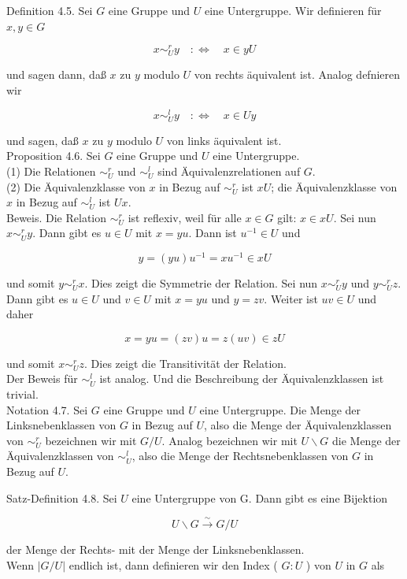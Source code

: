 \documentclass[10pt, letterpaper]{article}
\begin{document}
Definition 4.5. Sei $G$ eine Gruppe und $U$ eine Untergruppe. Wir definieren für $x, y \in G$

$$
x \sim_{U}^{r} y \quad: \Longleftrightarrow \quad x \in y U
$$

und sagen dann, daß $x$ zu $y$ modulo $U$ von rechts äquivalent ist. Analog defnieren wir

$$
x \sim_{U}^{l} y \quad: \Longleftrightarrow \quad x \in U y
$$

und sagen, daß $x$ zu $y$ modulo $U$ von links äquivalent ist.\\
Proposition 4.6. Sei $G$ eine Gruppe und $U$ eine Untergruppe.\\
(1) Die Relationen $\sim_{U}^{r}$ und $\sim_{U}^{l}$ sind Äquivalenzrelationen auf $G$.\\
(2) Die Äquivalenzklasse von $x$ in Bezug auf $\sim_{U}^{r}$ ist $x U$; die Äquivalenzklasse von $x$ in Bezug auf $\sim_{U}^{l}$ ist $U x$.\\
Beweis. Die Relation $\sim_{U}^{r}$ ist reflexiv, weil für alle $x \in G$ gilt: $x \in x U$. Sei nun $x \sim_{U}^{r} y$. Dann gibt es $u \in U$ mit $x=y u$. Dann ist $u^{-1} \in U$ und

$$
y=(y u) u^{-1}=x u^{-1} \in x U
$$

und somit $y \sim_{U}^{r} x$. Dies zeigt die Symmetrie der Relation. Sei nun $x \sim_{U}^{r} y$ und $y \sim_{U}^{r} z$. Dann gibt es $u \in U$ und $v \in U$ mit $x=y u$ und $y=z v$. Weiter ist $u v \in U$ und daher

$$
x=y u=(z v) u=z(u v) \in z U
$$

und somit $x \sim_{U}^{r} z$. Dies zeigt die Transitivität der Relation.\\
Der Beweis für $\sim_{U}^{l}$ ist analog. Und die Beschreibung der Äquivalenzklassen ist trivial.\\
Notation 4.7. Sei $G$ eine Gruppe und $U$ eine Untergruppe. Die Menge der Linksnebenklassen von $G$ in Bezug auf $U$, also die Menge der Äquivalenzklassen von $\sim_{U}^{r}$ bezeichnen wir mit $G / U$. Analog bezeichnen wir mit $U \backslash G$ die Menge der Äquivalenzklassen von $\sim_{U}^{l}$, also die Menge der Rechtsnebenklassen von $G$ in Bezug auf $U$.

Satz-Definition 4.8. Sei $U$ eine Untergruppe von G. Dann gibt es eine Bijektion

$$
U \backslash G \xrightarrow{\sim} G / U
$$

der Menge der Rechts- mit der Menge der Linksnebenklassen.\\
Wenn $|G / U|$ endlich ist, dann definieren wir den Index ( $G: U$ ) von $U$ in $G$ als
\end{document}
